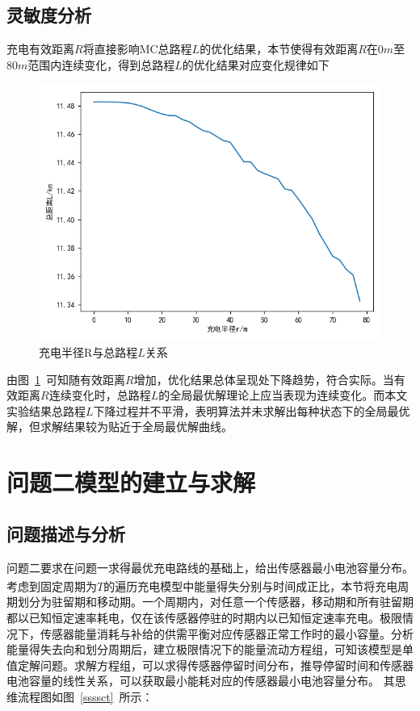\documentclass{whutmod}
\newcommand{\upcite}[1]{\textsuperscript{\cite{#1}}}
\begin{document}
\begin{table}[H]
\begin{tablenotes}
	\subsection{灵敏度分析}
       充电有效距离$R$将直接影响MC总路程$L$的优化结果，本节使得有效距离$R$在$0m$至$80m$范围内连续变化，得到总路程$L$的优化结果对应变化规律如下
	    \begin{figure}[H]
		\centering
		\includegraphics[width=.8\textwidth]{figures/ssss.png}
		\caption{充电半径R与总路程$L$关系}\label{ssssssssssssss}
		\end{figure}
	由图~\ref{ssssssssssssss}~可知随有效距离$R$增加，优化结果总体呈现处下降趋势，符合实际。当有效距离$R$连续变化时，总路程$L$的全局最优解理论上应当表现为连续变化。而本文实验结果总路程$L$下降过程并不平滑，表明算法并未求解出每种状态下的全局最优解，但求解结果较为贴近于全局最优解曲线。
	\section{问题二模型的建立与求解}
		\subsection{问题描述与分析}

			问题二要求在问题一求得最优充电路线的基础上，给出传感器最小电池容量分布。考虑到固定周期为$T$的遍历充电模型\upcite{7}中能量得失分别与时间成正比，本节将充电周期划分为驻留期和移动期。一个周期内，对任意一个传感器，移动期和所有驻留期都以已知恒定速率耗电，仅在该传感器停驻的时期内以已知恒定速率充电。极限情况下，传感器能量消耗与补给的供需平衡对应传感器正常工作时的最小容量。分析能量得失去向和划分周期后，建立极限情况下的能量流动方程组，可知该模型是单值定解问题。求解方程组，可以求得传感器停留时间分布，推导停留时间和传感器电池容量的线性关系，可以获取最小能耗对应的传感器最小电池容量分布。
			其思维流程图如图~\ref{ssssct}~所示：
			

\end{tablenotes}
\end{table}
\end{document}
